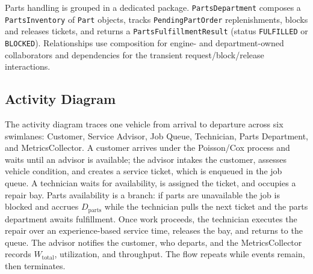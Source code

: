 \documentclass[conference]{IEEEtran}
\begin{document}
Parts handling is grouped in a dedicated package. \texttt{PartsDepartment}
composes a \texttt{PartsInventory} of \texttt{Part} objects, tracks
\texttt{PendingPartOrder} replenishments, blocks and releases tickets, and
returns a \texttt{PartsFulfillmentResult} (status \texttt{FULFILLED} or
\texttt{BLOCKED}). Relationships use composition for engine- and
department-owned collaborators and dependencies for the transient
request/block/release interactions.

\subsection{Activity Diagram}
The activity diagram traces one vehicle from arrival to departure across six
swimlanes: Customer, Service Advisor, Job Queue, Technician, Parts Department,
and MetricsCollector. A customer arrives under the Poisson/Cox process and
waits until an advisor is available; the advisor intakes the customer, assesses
vehicle condition, and creates a service ticket, which is enqueued in the job
queue. A technician waits for availability, is assigned the ticket, and occupies
a repair bay. Parts availability is a branch: if parts are unavailable the job
is blocked and accrues $D_{\text{parts}}$ while the technician pulls the next
ticket and the parts department awaits fulfillment. Once work proceeds, the
technician executes the repair over an experience-based service time, releases
the bay, and returns to the queue. The advisor notifies the customer, who
departs, and the MetricsCollector records $W_{\text{total}}$, utilization, and
throughput. The flow repeats while events remain, then terminates.
\end{document}
